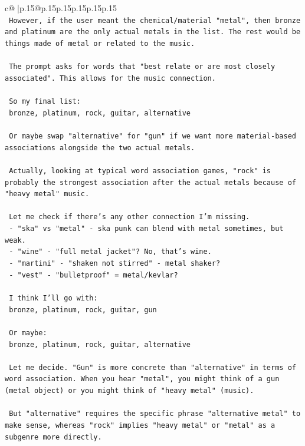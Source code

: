\documentclass{article}
\begin{document}
{\begin{supertabular}{c@{$\;$}|p{.15\linewidth}@{}p{.15\linewidth}p{.15\linewidth}p{.15\linewidth}p{.15\linewidth}p{.15\linewidth}}
{{{\\ 
\texttt{ However, if the user meant the chemical/material "metal", then bronze and platinum are the only actual metals in the list. The rest would be things made of metal or related to the music.} \\
\\ 
\texttt{ The prompt asks for words that "best relate or are most closely associated". This allows for the music connection.} \\
\\ 
\texttt{ So my final list:} \\
\texttt{ bronze, platinum, rock, guitar, alternative} \\
\\ 
\texttt{ Or maybe swap "alternative" for "gun" if we want more material{-}based associations alongside the two actual metals.} \\
\\ 
\texttt{ Actually, looking at typical word association games, "rock" is probably the strongest association after the actual metals because of "heavy metal" music.} \\
\\ 
\texttt{ Let me check if there's any other connection I'm missing.} \\
\texttt{ {-} "ska" vs "metal" {-} ska punk can blend with metal sometimes, but weak.} \\
\texttt{ {-} "wine" {-} "full metal jacket"? No, that's wine.} \\
\texttt{ {-} "martini" {-} "shaken not stirred" {-} metal shaker?} \\
\texttt{ {-} "vest" {-} "bulletproof" = metal/kevlar?} \\
\\ 
\texttt{ I think I'll go with:} \\
\texttt{ bronze, platinum, rock, guitar, gun} \\
\\ 
\texttt{ Or maybe:} \\
\texttt{ bronze, platinum, rock, guitar, alternative} \\
\\ 
\texttt{ Let me decide. "Gun" is more concrete than "alternative" in terms of word association. When you hear "metal", you might think of a gun (metal object) or you might think of "heavy metal" (music).} \\
\\ 
\texttt{ But "alternative" requires the specific phrase "alternative metal" to make sense, whereas "rock" implies "heavy metal" or "metal" as a subgenre more directly.} \\
}}}
\end{supertabular}}
\end{document}
